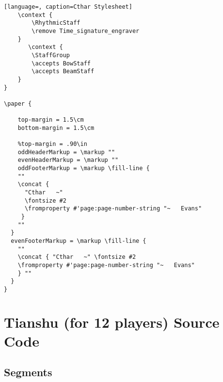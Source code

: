 \begin{lstlisting}[language=, caption=Cthar Stylesheet]
    \context {
        \RhythmicStaff
        \remove Time_signature_engraver
    }
       \context {
        \StaffGroup
		\accepts BowStaff
		\accepts BeamStaff
    }
}

\paper {

	top-margin = 1.5\cm
	bottom-margin = 1.5\cm

	%top-margin = .90\in
	oddHeaderMarkup = \markup ""
	evenHeaderMarkup = \markup ""
	oddFooterMarkup = \markup \fill-line {
    ""
    \concat {
      "Cthar   ~"
	  \fontsize #2
	  \fromproperty #'page:page-number-string "~   Evans"
     }
    ""
  }
  evenFooterMarkup = \markup \fill-line {
    ""
	\concat { "Cthar   ~" \fontsize #2
	\fromproperty #'page:page-number-string "~   Evans"
    } ""
  }
}
\end{lstlisting}
\doublespace



\section{Tianshu (for 12 players) Source Code}
\subsection{Segments}
